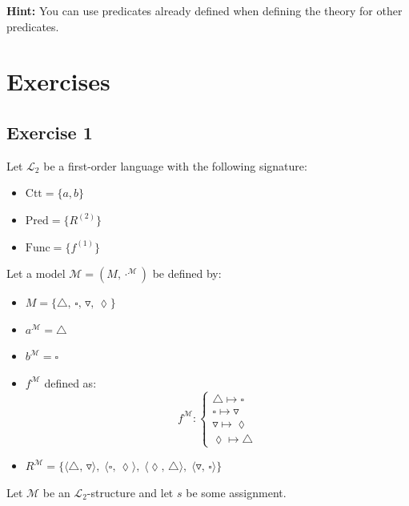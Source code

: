\documentclass[11pt]{article}
\begin{document}
    \textbf{Hint:} You can use predicates already defined when defining the theory for other predicates.

    \newpage
    \section{Exercises}\label{sec:exercises}

    \subsection{Exercise 1}\label{subsec:exercise-1}

    Let $\mathcal{L}_2$ be a first-order language with the following signature:
    \begin{itemize}
        \item $\text{Ctt} = \{a, b\}$
        \item $\text{Pred} = \{R^{(2)}\}$
        \item $\text{Func} = \{f^{(1)}\}$
    \end{itemize}

    Let a model $\mathcal{M} = (M, \cdot^\mathcal{M})$ be defined by:

    \begin{itemize}
        \item $M = \{\triangle,\, \square,\, \triangledown,\, \lozenge\}$
        \item $a^\mathcal{M} = \triangle$
        \item $b^\mathcal{M} = \square$
        \item $f^\mathcal{M}$ defined as:
            \[
                f^\mathcal{M} :
                \begin{cases}
                    \triangle \mapsto \square \\
                    \square \mapsto \triangledown \\
                    \triangledown \mapsto \lozenge \\
                    \lozenge \mapsto \triangle
                \end{cases}
            \]
        \item $R^\mathcal{M} = \{
            \langle \triangle,\, \triangledown \rangle,\;
            \langle \square,\, \lozenge \rangle,\;
            \langle \lozenge,\, \triangle \rangle,\;
            \langle \triangledown,\, \square \rangle
            \}$
    \end{itemize}

    Let $\mathcal{M}$ be an $\mathcal{L}_2$-structure and let $s$ be some assignment.
\end{document}

